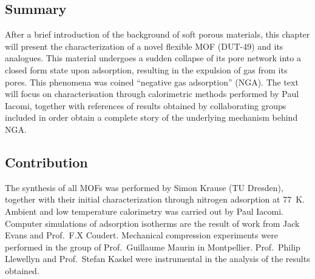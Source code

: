 \subsection*{Summary}

After a brief introduction of the background of soft porous 
materials, this chapter will present the characterization of a novel
flexible MOF (DUT-49) and its analogues. This material undergoes
a sudden collapse of its pore network into a closed form state
upon adsorption, resulting in the expulsion of gas from its pores.
This phenomena was coined ``negative gas adsorption'' (NGA).
The text will focus on characterisation through calorimetric methods
performed by Paul Iacomi, together with references
of results obtained by collaborating groups included in order
obtain a complete story of the underlying mechanism behind NGA.

\subsection*{Contribution}

The synthesis of all MOFs was performed by Simon Krause
(TU Dresden), together with their initial characterization through 
nitrogen adsorption at \SI{77}{\kelvin}.
Ambient and low temperature calorimetry was carried out by 
Paul Iacomi. Computer simulations of adsorption isotherms
are the result of work from Jack Evans and Prof.\ F.X Coudert.
Mechanical compression experiments were performed in 
the group of Prof.\ Guillaume Maurin in Montpellier.
Prof.\ Philip Llewellyn and Prof.\ Stefan Kaskel were 
instrumental in the analysis of the results obtained.
